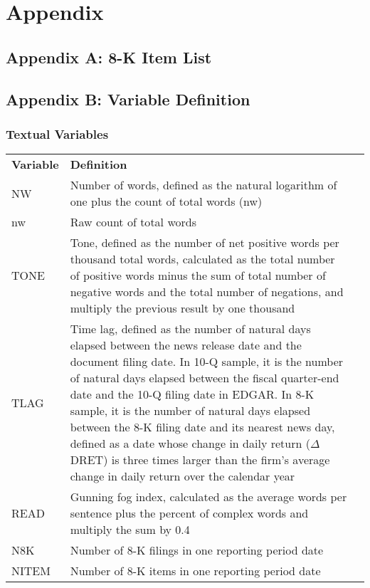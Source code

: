 \section*{Appendix}
\subsection*{Appendix A: 8-K Item List}
\label{appa}


\newpage
\subsection*{Appendix B: Variable Definition}
\label{appb}
\subsubsection*{Textual Variables}
\begin{table}[H]
	\centering
	\begin{tabular}{lp{15cm}p{15cm}}
		\midrule
		\midrule
		\textbf{Variable} & \textbf{Definition} \\
		NW & Number of words, defined as the natural logarithm of one plus the count of total words (nw)\\
		nw & Raw count of total words\\
		TONE & Tone, defined as the number of net positive words per thousand total words, calculated as the total number of positive words minus the sum of total number of negative words and the total number of negations, and multiply the previous result by one thousand\\
		TLAG & Time lag, defined as the number of natural days elapsed between the news release date and the document filing date. In 10-Q sample, it is the number of natural days elapsed between the fiscal quarter-end date and the 10-Q filing date in EDGAR. In 8-K sample, it is the number of natural days elapsed between the 8-K filing date and its nearest news day, defined as a date whose change in daily return ($\Delta$DRET) is three times larger than the firm’s average change in daily return over the calendar year\\
		READ & Gunning fog index, calculated as the average words per sentence plus the percent of complex words and multiply the sum by 0.4 \\
		N8K & Number of 8-K filings in one reporting period date \\
		NITEM & Number of 8-K items in one reporting period date \\
		\bottomrule
		\bottomrule
	\end{tabular}%
\end{table}%

